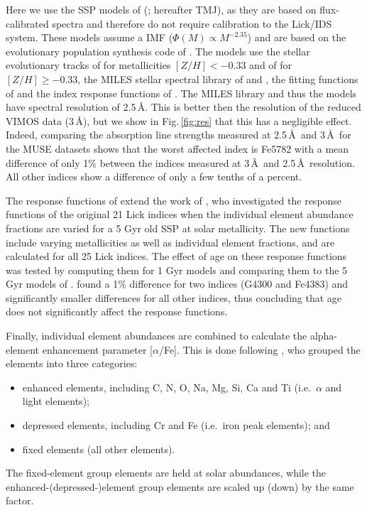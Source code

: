 			Here we use the SSP models of \citeauthor{Thomas2010} (\citeyear{Thomas2010}; hereafter TMJ), as they are based on flux-calibrated spectra and therefore do not require calibration to the Lick/IDS system. These models assume a \citet{Salpeter1955} IMF ($\Phi(M) \propto M^{-2.35}$) and are based on the evolutionary population synthesis code of \citet{Maraston1998}. The models use the stellar evolutionary tracks of \citet{Cassisi1997} for metallicities $[Z/H] < -0.33$ and of \citet{Girardi2000} for $[Z/H] \ge -0.33$, the MILES stellar spectral library of \citet{Sanchez-Blazquez2006a} and \citet{Falcon-Barroso2011a}, the fitting functions of \citet{Johansson2010} and the index response functions of \citet{Korn2005}. The MILES library and thus the models have spectral resolution of 2.5\,\AA. This is better then the resolution of the reduced VIMOS data (3\,\AA), but we show in Fig.\,\ref{fig:res} that this has a negligible effect. Indeed, comparing the absorption line strengths measured at 2.5\,\AA\ and 3\,\AA\ for the MUSE datasets shows that the worst affected index is Fe5782 with a mean difference of only 1\% between the indices measured at 3\,\AA\ and 2.5\,\AA\ resolution. All other indices show a difference of only a few tenths of a percent. 

			The response functions of \citet{Korn2005} extend the work of \citet{Tripicco1995}, who investigated the response functions of the original 21 Lick indices when the individual element abundance fractions are varied for a 5 Gyr old SSP at solar metallicity. The new functions include varying metallicities as well as individual element fractions, and are calculated for all 25 Lick indices. The effect of age on these response functions was tested by computing them for 1 Gyr models and comparing them to the 5 Gyr models of \citet{Tripicco1995}. \citet{Korn2005} found a 1\% difference for two indices (G4300 and Fe4383) and significantly smaller differences for all other indices, thus concluding that age does not significantly affect the response functions.

			Finally, individual element abundances are combined to calculate the alpha-element enhancement parameter [$\alpha$/Fe]. This is done following \citet{Trager2000}, who grouped the elements into three categories: 
			\begin{itemize}
				\item enhanced elements, including C, N, O, Na, Mg, Si, Ca and Ti (i.e.\ $\alpha$ and light elements); 
				\item depressed elements, including Cr and Fe (i.e.\ iron peak elements); and
				\item fixed elements (all other elements). 
			\end{itemize}
			The fixed-element group elements are held at solar abundances, while the enhanced-(depressed-)element group elements are scaled up (down) by the same factor. 

